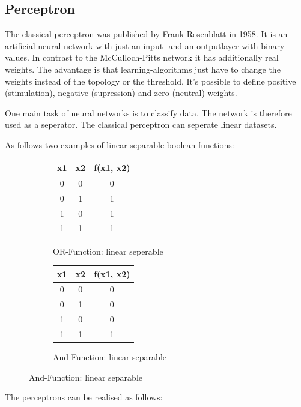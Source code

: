 \documentclass[10pt,a4paper,DIV=11]{scrreprt}
\begin{document}
\subsection{Perceptron}
The classical perceptron was published by Frank Rosenblatt in 1958\cite{ros}.
It is an artificial neural network with just an input- and an outputlayer with binary values. In contrast to the McCulloch-Pitts network it has additionally real weights. The advantage is that learning-algorithms just have to change the weights instead of the topology or the threshold. It's possible to define positive (stimulation), negative (supression) and zero (neutral) weights.

One main task of neural networks is to classify data. The network is therefore used as a seperator.
The classical perceptron can seperate linear datasets. 

As follows two examples of linear separable boolean functions:

\begin{figure}[H]
	\begin{subfigure}[]{0.5\linewidth}
	\centering
	\begin{tabular}{|c|c|c|}
		\hline
		x1 & x2 & f(x1, x2)\\
		\hline
		0 & 0 & 0 \\
		\hline
		0 & 1 & 1 \\
		\hline
		1 & 0 & 1 \\
		\hline
		1 & 1 & 1 \\
		\hline
	\end{tabular}
	\caption{OR-Function: linear seperable}
	\label{fig:linsep1}
	\end{subfigure}
\begin{subfigure}[]{0.5\linewidth}
	\centering
	\begin{tabular}{|c|c|c|}
		\hline
		x1 & x2 & f(x1, x2)\\
		\hline
		0 & 0 & 0 \\
		\hline
		0 & 1 & 0 \\
		\hline
		1 & 0 & 0 \\
		\hline
		1 & 1 & 1 \\
		\hline
	\end{tabular}
	\caption{And-Function: linear separable}
	\label{fig:linsep2}
\end{subfigure}
\end{figure}

The perceptrons can be realised as follows:
\end{document}
